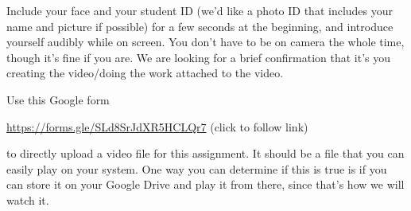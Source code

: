 \documentclass[12pt, oneside]{article}
\begin{document}
Include your face and your student ID (we'd like a photo ID that includes your name 
and picture if possible) for a few seconds at the beginning, and introduce yourself 
audibly while on screen. You don't have to be on camera the whole time, though it's fine 
if you are. We are looking for a brief confirmation that it's you creating the 
video/doing the work attached to the video.

Use this Google form

\url{https://forms.gle/SLd8SrJdXR5HCLQr7}  (click to follow link) 

to directly upload a video file for this assignment.
It should be a file that you can easily play on your system. 
One way you can determine if this is true is if you can store it on your Google Drive and play it from there,
since that's how we will watch it.
\end{document}
